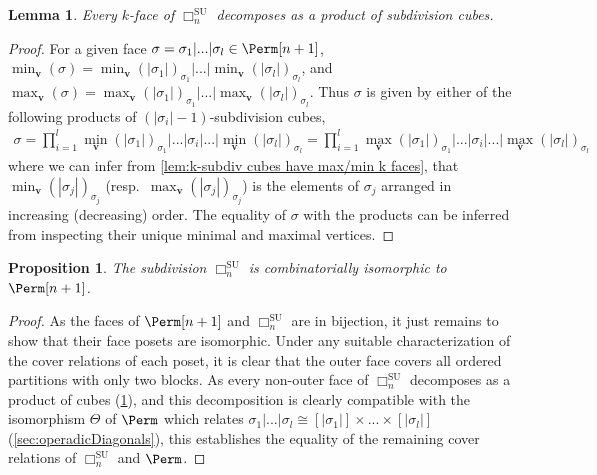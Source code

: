\documentclass{amsart}
\newtheorem{proposition}[theorem]{Proposition}
\newtheorem{lemma}[theorem]{Lemma}
\theoremstyle{definition}
\newcommand{\resp}{resp.~} %
\newcommand{\SU}{\mathrm{SU}}
\newcommand{\divcube}[1]{\Box_{#1}}
\begin{document}
\begin{lemma}\label{lem:Theta as a product of cubes}
Every $k$-face of $\divcube{n}^\SU$ decomposes as a product of subdivision cubes.
\end{lemma}
\begin{proof}
For a given face $\sigma=\sigma_1|...|\sigma_l \in \Perm[n+1]$, $\min_{\mathbf{v}}(\sigma) = \min_{\mathbf{v}}(|\sigma_1|)_{\sigma_1}|...|\min_{\mathbf{v}}(|\sigma_l|)_{\sigma_l}$, and $\max_{\mathbf{v}}(\sigma) = \max_{\mathbf{v}}(|\sigma_1|)_{\sigma_1}|...|\max_{\mathbf{v}}(|\sigma_l|)_{\sigma_l}$.
Thus $\sigma$ is given by either of the following products of $(|\sigma_i|-1)$-subdivision cubes,
\begin{align*}
    \sigma = \prod_{i=1}^l \text{$\min$}_{\mathbf{v}}(|\sigma_1|)_{\sigma_1}|...|\sigma_i|...|\text{$\min$}_{\mathbf{v}}(|\sigma_l|)_{\sigma_l}=\prod_{i=1}^l \text{$\max$}_{\mathbf{v}}(|\sigma_1|)_{\sigma_1}|...|\sigma_i|...|\text{$\max$}_{\mathbf{v}}(|\sigma_l|)_{\sigma_l}
\end{align*}
where we can infer from \cref{lem:k-subdiv cubes have max/min k faces}, that $\min_{\mathbf{v}}(|\sigma_j|)_{\sigma_j}$ (\resp $\max_{\mathbf{v}}(|\sigma_j|)_{\sigma_j}$) is the elements of $\sigma_j$ arranged in increasing (decreasing) order.
The equality of $\sigma$ with the products can be inferred from inspecting their unique minimal and maximal vertices.
\end{proof}

\begin{proposition}\label{prop:subdiv cube Combinatorially Isomorphic to perm}
The subdivision $\divcube{n}^\SU$ is combinatorially isomorphic to $\Perm[n+1]$. 
\end{proposition}

\begin{proof}
As the faces of $\Perm[n+1]$ and $\divcube{n}^\SU$ are in bijection, it just remains to show that their face posets are isomorphic.
Under any suitable characterization of the cover relations of each poset, it is clear that the outer face covers all ordered partitions with only two blocks.
As every non-outer face of $\divcube{n}^\SU$ decomposes as a product of cubes (\cref{lem:Theta as a product of cubes}), and this decomposition is clearly compatible with the isomorphism $\Theta$ of $\Perm$ which relates $\sigma_1|...|\sigma_l {\cong} [|\sigma_1|]\times ...\times [|\sigma_l|]$ (\cref{sec:operadicDiagonals}), this establishes the equality of the remaining cover relations of $\divcube{n}^\SU$ and $\Perm$.
\end{proof}
\end{document}

